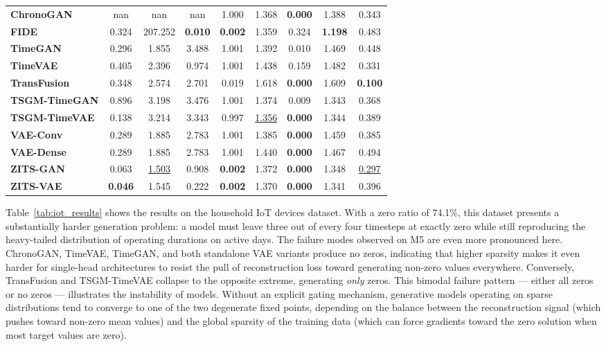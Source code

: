 \documentclass[make,article,submit,moreauthors]{Definitions/mdpi}
\begin{document}
\begin{table}[htbp]
\begin{tabular}{l cccccccc}
\textbf{ChronoGAN}    & nan & nan & nan & 1.000 & 1.368 & \textbf{0.000} & 1.388 & 0.343 \\
\textbf{FIDE}         & 0.324 & 207.252 & \textbf{0.010} & \textbf{0.002} & 1.359 & 0.324 & \textbf{1.198} & 0.483 \\
\textbf{TimeGAN}      & 0.296 & 1.855 & 3.488 & 1.001 & 1.392 & 0.010 & 1.469 & 0.448 \\
\textbf{TimeVAE}      & 0.405 & 2.396 & 0.974 & 1.001 & 1.438 & 0.159 & 1.482 & 0.331 \\
\textbf{TransFusion}  & 0.348 & 2.574 & 2.701 & 0.019 & 1.618 & \textbf{0.000} & 1.609 & \textbf{0.100} \\
\textbf{TSGM-TimeGAN} & 0.896 & 3.198 & 3.476 & 1.001 & 1.374 & 0.009 & 1.343 & 0.368 \\
\textbf{TSGM-TimeVAE} & 0.138 & 3.214 & 3.343 & 0.997 & \underline{1.356} & \textbf{0.000} & 1.344 & 0.389 \\
\textbf{VAE-Conv}     & 0.289 & 1.885 & 2.783 & 1.001 & 1.385 & \textbf{0.000} & 1.459 & 0.385 \\
\textbf{VAE-Dense}    & 0.289 & 1.885 & 2.783 & 1.001 & 1.440 & \textbf{0.000} & 1.467 & 0.494 \\
\textbf{ZITS-GAN}     & 0.063 & \underline{1.503} & 0.908 & \textbf{0.002} & 1.372 & \textbf{0.000} & 1.348 & \underline{0.297} \\
\textbf{ZITS-VAE}     & \textbf{0.046} & 1.545 & 0.222 & \textbf{0.002} & 1.370 & \textbf{0.000} & 1.341 & 0.396 \\
\bottomrule
\end{tabular}
\end{table}


Table~\ref {tab:iot_results} shows the results on the household IoT devices dataset. With a zero ratio of 74.1\%, this dataset presents a substantially harder generation problem: a model must leave three out of every four timesteps at exactly zero while still reproducing the heavy-tailed distribution of operating durations on active days. The failure modes observed on M5 are even more pronounced here. ChronoGAN, TimeVAE, TimeGAN, and both standalone VAE variants produce no zeros, indicating that higher sparsity makes it even harder for single-head architectures to resist the pull of reconstruction loss toward generating non-zero values everywhere. Conversely, TransFusion and TSGM-TimeVAE collapse to the opposite extreme, generating \emph{only} zeros. This bimodal failure pattern — either all zeros or no zeros — illustrates the instability of models. Without an explicit gating mechanism, generative models operating on sparse distributions tend to converge to one of the two degenerate fixed points, depending on the balance between the reconstruction signal (which pushes toward non-zero mean values) and the global sparsity of the training data (which can force gradients toward the zero solution when most target values are zero).
\end{document}
